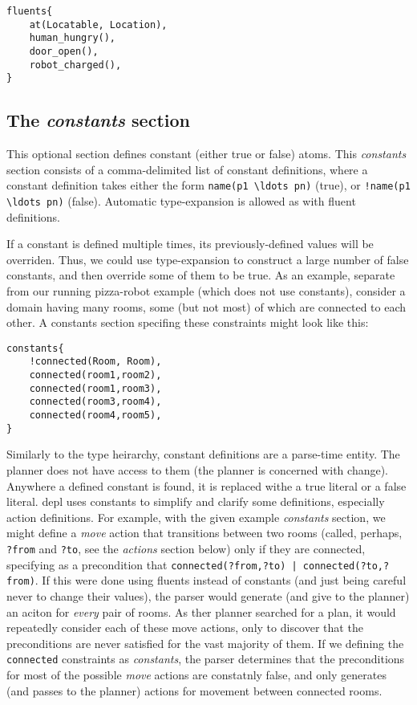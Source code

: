 \documentclass{article}
\begin{document}
\begin{verbatim}
fluents{
    at(Locatable, Location),
    human_hungry(),
    door_open(),
    robot_charged(),
}
\end{verbatim}



\subsection{The \emph{constants} section}


This optional section defines constant (either true or false) atoms. This
\emph{constants} section consists of a comma-delimited list of constant
definitions, where a constant definition takes either the form
\verb|name(p1 \ldots pn)| (true), 
or
\verb|!name(p1 \ldots pn)| (false).
Automatic type-expansion is allowed as with fluent definitions.

If a constant is defined multiple times, its previously-defined values will be
overriden. Thus, we could use type-expansion to construct
a large number of false constants, and then
override some of them to be true. As an example, separate from our
running pizza-robot example (which does not use constants), consider a domain
having many rooms, some (but not most) of which are connected to each other.
A constants section specifing these constraints might look like this:

\begin{verbatim}
constants{
    !connected(Room, Room),
    connected(room1,room2),
    connected(room1,room3),
    connected(room3,room4),
    connected(room4,room5),
}
\end{verbatim}

Similarly to the type heirarchy, constant definitions are a parse-time entity.
The planner does not have access to them (the planner is concerned with change).
Anywhere a defined constant is found, it is replaced withe a true literal or a
false literal.  depl uses constants to simplify and clarify some definitions,
especially action definitions. For example, with the given example
\emph{constants} section, we might define a \emph{move} action that transitions
between two rooms (called, perhaps, \verb|?from| and \verb|?to|, see the
\emph{actions} section below) only if they are connected, specifying as a
precondition that \verb"connected(?from,?to) | connected(?to,?from)".  If this
were done using fluents instead of constants (and just being careful never to
change their values), the parser would generate (and give to the planner) an
aciton for \emph{every} pair of rooms. As ther planner searched for a plan, it
would repeatedly consider each of these move actions, only to discover that the
preconditions are never satisfied for the vast majority of them. If we defining
the \verb|connected| constraints as \emph{constants}, the parser determines that
the preconditions for most of the possible \emph{move} actions are constatnly
false, and only generates (and passes to the planner) actions for movement
between connected rooms.
\end{document}
